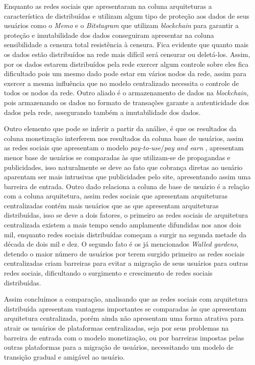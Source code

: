Enquanto as redes sociais que apresentaram na coluna arquiteturas a característica de  distribuídas e utilizam algum tipo de proteção aos dados de seus usuários como o \textit{Memo} e o \textit{Bitstagram} que utilizam \textit{blockchain} para garantir a proteção e imutabilidade dos dados conseguiram apresentar na coluna sensibilidade a censura total resistência à censura. Fica evidente que quanto mais os dados estão distribuídos na rede mais difícil será  censurar ou deletá-los. Assim, por os dados estarem distribuídos pela rede exercer algum controle sobre eles fica dificultado pois um mesmo dado pode estar em vários nodos da rede, assim para exercer a mesma influência que no modelo centralizado necessita o controle de todos os nodos da rede. Outro aliado é o armazenamento de dados na \textit{blockchain}, pois armazenando os dados no formato de transações garante a autenticidade dos dados pela rede, assegurando também a imutabilidade dos dados.

Outro elemento que pode se inferir a partir da análise, é que os resultados  da coluna monetização interferem nos resultados da coluna base de usuários, assim as redes sociais que apresentam o modelo \textit{pay-to-use}/\textit{pay and earn} , apresentam menor base de usuários se comparadas às que utilizam-se de propagandas e publicidades, isso naturalmente se deve ao fato que cobrança diretas ao usuário aparentam ser mais intrusivas que publicidades pelo site, apresentando assim uma barreira de entrada. Outro dado relaciona a coluna de base de usuário é a relação com a coluna arquitetura, assim redes sociais que apresentam arquiteturas centralizadas contém mais usuários que as que apresentam arquiteturas distribuídas, isso se deve a dois fatores, o primeiro as redes sociais de arquitetura centralizada existem a mais tempo sendo amplamente difundidas nos anos dois mil, enquanto redes sociais distribuídas começam a surgir na segunda metade da década de dois mil e dez. O segundo fato é os já mencionados \textit{Walled gardens}, detendo o maior número de usuários por terem surgido primeiro as redes sociais centralizadas criam barreiras para evitar a migração de seus usuários para outras redes sociais, dificultando o surgimento e crescimento de redes sociais distribuídas.

Assim concluímos a comparação, analisando que as redes sociais com arquitetura distribuída apresentam vantagens importantes se comparadas às que apresentam arquitetura centralizada, porém ainda não apresentam uma forma atrativa para atrair os usuários de plataformas centralizadas, seja por seus problemas na barreira de entrada com o modelo monetização, ou por barreiras impostas pelas outras plataformas para a migração de usuários, necessitando um modelo de transição gradual e amigável ao usuário.


